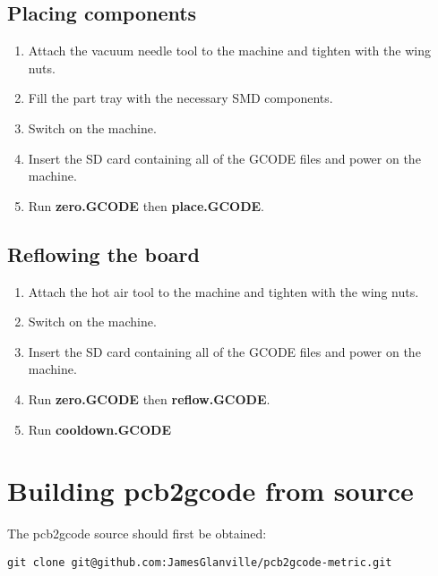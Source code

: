 \documentclass[a4paper,11pt]{article}  %
\begin{document}
\subsection{Placing components}
\begin{enumerate}
\item
Attach the vacuum needle tool to the machine and tighten with the wing nuts.

\item
Fill the part tray with the necessary SMD components.

\item
Switch on the machine.

\item
Insert the SD card containing all of the GCODE files and power on the 
machine.

\item
Run \textbf{zero.GCODE} then \textbf{place.GCODE}.
\end{enumerate}

\subsection{Reflowing the board}
\begin{enumerate}
\item
Attach the hot air tool to the machine and tighten with the wing nuts.

\item
Switch on the machine.

\item
Insert the SD card containing all of the GCODE files and power on the 
machine.

\item
Run \textbf{zero.GCODE} then \textbf{reflow.GCODE}.

\item
Run \textbf{cooldown.GCODE}

\end{enumerate}


\newpage
\appendix
\appendixpage
\addappheadtotoc

\section{Building pcb2gcode from source}
\label{sec:buildpcb2gcode}

The pcb2gcode source should first be obtained:
\begin{lstlisting}[frame=single,breaklines=true]
git clone git@github.com:JamesGlanville/pcb2gcode-metric.git
\end{lstlisting}
\end{document}
